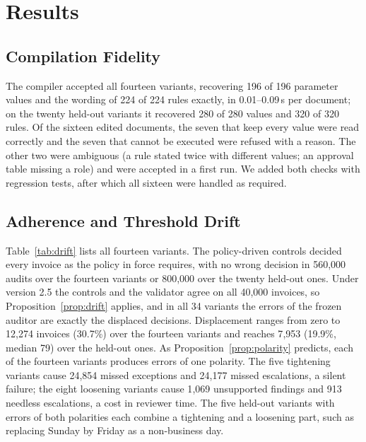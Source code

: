 \documentclass[9pt,a4paper,twocolumn]{extarticle}
\begin{document}
\section{Results}
\label{sec:results}
\subsection{Compilation Fidelity}
The compiler accepted all fourteen variants, recovering 196 of 196 parameter values and the wording of 224 of 224 rules exactly, in 0.01--0.09\,s per document; on the twenty held-out variants it recovered 280 of 280 values and 320 of 320 rules. Of the sixteen edited documents, the seven that keep every value were read correctly and the seven that cannot be executed were refused with a reason. The other two were ambiguous (a rule stated twice with different values; an approval table missing a role) and were accepted in a first run. We added both checks with regression tests, after which all sixteen were handled as required.

\subsection{Adherence and Threshold Drift}
Table~\ref{tab:drift} lists all fourteen variants. The policy-driven controls decided every invoice as the policy in force requires, with no wrong decision in 560{,}000 audits over the fourteen variants or 800{,}000 over the twenty held-out ones. Under version 2.5 the controls and the validator agree on all 40{,}000 invoices, so Proposition~\ref{prop:drift} applies, and in all 34 variants the errors of the frozen auditor are exactly the displaced decisions. Displacement ranges from zero to 12{,}274 invoices (30.7\%) over the fourteen variants and reaches 7{,}953 (19.9\%, median 79) over the held-out ones. As Proposition~\ref{prop:polarity} predicts, each of the fourteen variants produces errors of one polarity. The five tightening variants cause 24{,}854 missed exceptions and 24{,}177 missed escalations, a silent failure; the eight loosening variants cause 1{,}069 unsupported findings and 913 needless escalations, a cost in reviewer time. The five held-out variants with errors of both polarities each combine a tightening and a loosening part, such as replacing Sunday by Friday as a non-business day.
\end{document}
